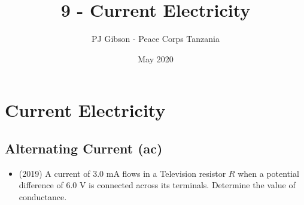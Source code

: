 \documentclass{article}
\title{9 - Current Electricity}
\author{PJ Gibson - Peace Corps Tanzania}
\date{May 2020}
\begin{document}
\maketitle


\section{Current Electricity}

\subsection{Alternating Current (ac)}
\begin{itemize}
\item (2019)  A current of $ 3.0$ mA flows in a Television resistor $ R$ when a potential difference of $ 6.0$ V is connected across its terminals. Determine the value of conductance.
\end{itemize}
\end{document}
